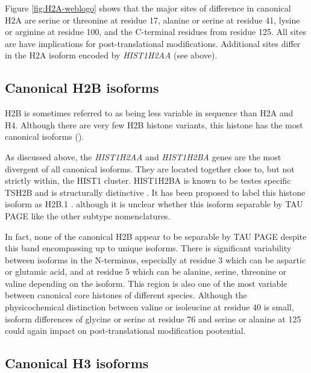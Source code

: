 	Figure \ref{fig:H2A-weblogo} shows that the major sites of difference in canonical H2A are 
	serine or threonine at residue 17, 
	alanine or serine at residue 41, 
	lysine or arginine at residue 100, 
	and the C-terminal residues from residue 125. 
	All sites are have implications for post-translational modifications. 
	Additional sites differ in the H2A isoform encoded by \textit{HIST1H2AA} (see above).
	
  \subsection{Canonical H2B isoforms}

	H2B is sometimes referred to as being less variable in sequence than H2A and H4. 
	Although there are very few H2B histone variants, this histone has the most canonical isoforms ().

	As discussed above, the \textit{HIST1H2AA} and \textit{HIST1H2BA} genes 
	are the most divergent of all canonical isoforms.
	They are located together close to, but not strictly within, the HIST1 cluster. 
	HIST1H2BA is known to be testes specific TSH2B and is structurally distinctive . 
	It has been proposed to label this histone isoform as H2B.1 . 
	although it is unclear whether this isoform separable by TAU PAGE like the other subtype nomenclatures.

	In fact, none of the canonical H2B appear to be separable by TAU PAGE 
	despite this band encompassing up to \HTwoBUniqueProteins{} unique isoforms. 
	There is significant variability between isoforms in the N-terminus, 
	especially at residue 3 which can be aspartic or glutamic acid, 
	and at residue 5 which can be alanine, serine, threonine or valine depending on the isoform. 
	This region is also one of the most variable between canonical core histones of different species. 
	Although the physicochemical distinction between valine or isoleucine at residue 40 is small, 
	isoform differences of glycine or serine at residue 76 
	and serine or alanine at 125 could again impact on post-translational modification pootential.
	
  \subsection{Canonical H3 isoforms}
	
